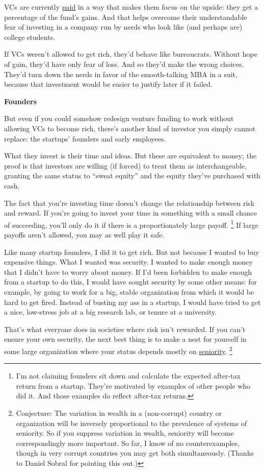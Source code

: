 \documentclass[12pt]{book}
\begin{document}
VCs are currently \href{venturecapital.html}{paid} in a way that makes
them focus on the upside: they get a percentage of the fund's gains. And
that helps overcome their understandable fear of investing in a company
run by nerds who look like (and perhaps are) college students.

If VCs weren't allowed to get rich, they'd behave like bureaucrats.
Without hope of gain, they'd have only fear of loss. And so they'd make
the wrong choices. They'd turn down the nerds in favor of the
smooth-talking MBA in a suit, because that investment would be easier to
justify later if it failed.

\textbf{Founders}

But even if you could somehow redesign venture funding to work without
allowing VCs to become rich, there's another kind of investor you simply
cannot replace: the startups' founders and early employees.

What they invest is their time and ideas. But these are equivalent to
money; the proof is that investors are willing (if forced) to treat them
as interchangeable, granting the same status to ``sweat equity'' and the
equity they've purchased with cash.

The fact that you're investing time doesn't change the relationship
between risk and reward. If you're going to invest your time in
something with a small chance of succeeding, you'll only do it if there
is a proportionately large payoff. \footnote{I'm not claiming founders sit down and calculate the expected
after-tax return from a startup. They're motivated by examples of other
people who did it. And those examples do reflect after-tax returns.} If large
payoffs aren't allowed, you may as well play it safe.

Like many startup founders, I did it to get rich. But not because I
wanted to buy expensive things. What I wanted was security. I wanted to
make enough money that I didn't have to worry about money. If I'd been
forbidden to make enough from a startup to do this, I would have sought
security by some other means: for example, by going to work for a big,
stable organization from which it would be hard to get fired. Instead of
busting my ass in a startup, I would have tried to get a nice,
low-stress job at a big research lab, or tenure at a university.

That's what everyone does in societies where risk isn't rewarded. If you
can't ensure your own security, the next best thing is to make a nest
for yourself in some large organization where your status depends mostly
on \href{ladder.html}{seniority}. \footnote{Conjecture: The variation in wealth in a (non-corrupt) country
or organization will be inversely proportional to the prevalence of
systems of seniority. So if you suppress variation in wealth, seniority
will become correspondingly more important. So far, I know of no
counterexamples, though in very corrupt countries you may get both
simultaneously. (Thanks to Daniel Sobral for pointing this out.)}
\end{document}
